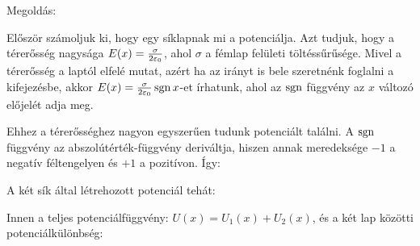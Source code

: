 
\ifdefined\megoldas

 Megoldás: 

 Először számoljuk ki, hogy egy síklapnak mi a potenciálja. Azt tudjuk, hogy a térerősség nagysága $E(x)=\frac{\sigma}{2\varepsilon_0}$, ahol $\sigma$ a fémlap felületi töltéssűrűsége. Mivel a térerősség a laptól elfelé mutat, azért ha az irányt is bele szeretnénk foglalni a kifejezésbe, akkor $E(x)=\frac{\sigma}{2\varepsilon_0}\mathop{\mathrm{sgn}}\nolimits{x}$-et írhatunk, ahol az $\mathop{\mathrm{sgn}}\nolimits$ függvény az $x$ változó előjelét adja meg. 

 Ehhez a térerősséghez nagyon egyszerűen tudunk potenciált találni. A $\mathop{\mathrm{sgn}}\nolimits$ függvény az abszolútérték-függvény deriváltja, hiszen annak meredeksége $-1$ a negatív féltengelyen és $+1$ a pozitívon. Így:

 A két sík által létrehozott potenciál tehát:

 Innen a teljes potenciálfüggvény: $U(x)=U_1(x)+U_2(x)$, és a két lap közötti potenciálkülönbség:
 
\fi
